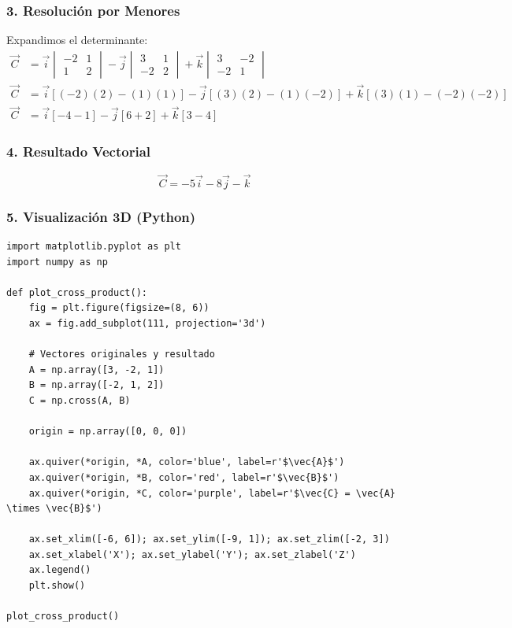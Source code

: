 \documentclass[12pt, a4paper]{article}
\begin{document}
\subsubsection*{3. Resolución por Menores}
Expandimos el determinante:
\begin{align*}
    \vec{C} &= \vec{i} \begin{vmatrix} -2 & 1 \\ 1 & 2 \end{vmatrix} - \vec{j} \begin{vmatrix} 3 & 1 \\ -2 & 2 \end{vmatrix} + \vec{k} \begin{vmatrix} 3 & -2 \\ -2 & 1 \end{vmatrix} \\
    \vec{C} &= \vec{i} [(-2)(2) - (1)(1)] - \vec{j} [(3)(2) - (1)(-2)] + \vec{k} [(3)(1) - (-2)(-2)] \\
    \vec{C} &= \vec{i} [-4 - 1] - \vec{j} [6 + 2] + \vec{k} [3 - 4]
\end{align*}

\subsubsection*{4. Resultado Vectorial}
\begin{equation*}
    \vec{C} = -5\vec{i} - 8\vec{j} - \vec{k}
\end{equation*}

\subsubsection*{5. Visualización 3D (Python)}
\begin{lstlisting}
import matplotlib.pyplot as plt
import numpy as np

def plot_cross_product():
    fig = plt.figure(figsize=(8, 6))
    ax = fig.add_subplot(111, projection='3d')
    
    # Vectores originales y resultado
    A = np.array([3, -2, 1])
    B = np.array([-2, 1, 2])
    C = np.cross(A, B)
    
    origin = np.array([0, 0, 0])
    
    ax.quiver(*origin, *A, color='blue', label=r'$\vec{A}$')
    ax.quiver(*origin, *B, color='red', label=r'$\vec{B}$')
    ax.quiver(*origin, *C, color='purple', label=r'$\vec{C} = \vec{A} \times \vec{B}$')
    
    ax.set_xlim([-6, 6]); ax.set_ylim([-9, 1]); ax.set_zlim([-2, 3])
    ax.set_xlabel('X'); ax.set_ylabel('Y'); ax.set_zlabel('Z')
    ax.legend()
    plt.show()

plot_cross_product()
\end{lstlisting}
\end{document}

